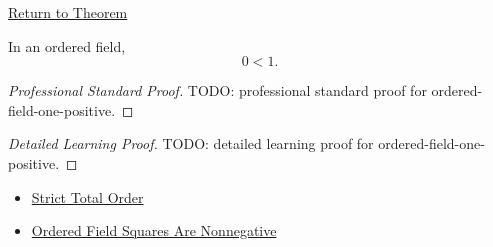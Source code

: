 \newpage
{}
\label{prf:ordered-field-one-positive}

\begin{remark*}[Return]
\hyperref[thm:ordered-field-one-positive]{Return to Theorem}
\end{remark*}

\begin{theorem*}
In an ordered field,
\[
0<1.
\]
\end{theorem*}

\begin{proof}[Professional Standard Proof]
\LRAProofBodyStart
TODO: professional standard proof for ordered-field-one-positive.
\end{proof}

\begin{proof}[Detailed Learning Proof]
\LRAProofBodyStart
TODO: detailed learning proof for ordered-field-one-positive.
\end{proof}

\begin{remark*}
\end{remark*}

\begin{dependencies}
\begin{itemize}
  \item \hyperref[def:strict-total-order]{Strict Total Order}
  \item \hyperref[prop:product-of-positives-is-positive-q]{Ordered Field Squares Are Nonnegative}
\end{itemize}
\end{dependencies}

\clearpage
